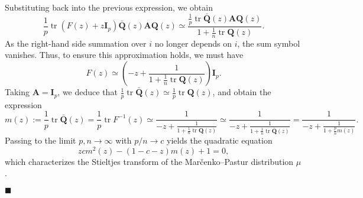 \documentclass[12pt]{article}
\DeclareMathOperator{\tr}{tr}
\begin{document}
Substituting back into the previous expression, we obtain
$$
\frac{1}{p} \tr (F(z) + z \mathbf{I}_p) \bar{\mathbf{Q}}(z) \mathbf{A} \mathbf{Q}(z) 
\simeq \frac{\frac{1}{p} \tr \bar{\mathbf{Q}}(z) \mathbf{A} \mathbf{Q}(z)}{1 + \frac{1}{n} \tr \mathbf{Q}(z)}.
$$
As the right-hand side summation over $i$ no longer depends on $i$, the sum symbol vanishes. Thus, to ensure this approximation holds, we must have
$$
F(z) \simeq \left( -z + \frac{1}{1 + \frac{1}{n} \tr \mathbf{Q}(z)} \right) \mathbf{I}_p.
$$
Taking $\mathbf{A} = \mathbf{I}_p$, we deduce that $\frac{1}{p} \tr \bar{\mathbf{Q}}(z) \simeq \frac{1}{p} \tr \mathbf{Q}(z)$, and obtain the expression
\begin{equation*}
m(z) := \frac{1}{p} \tr \bar{\mathbf{Q}}(z)
= \frac{1}{p} \tr F^{-1}(z)
\simeq \frac{1}{-z + \frac{1}{1 + \frac{1}{n} \tr \mathbf{Q}(z)}} \simeq \frac{1}{-z + \frac{1}{1 + \frac{1}{n} \tr \bar{\mathbf{Q}}(z)}}
= \frac{1}{-z + \frac{1}{1 + \frac{p}{n} m(z)}}.
\end{equation*}
Passing to the limit $p, n \to \infty$ with $p/n \to c$ yields the quadratic equation
$$
z c m^2(z) - (1 - c - z) m(z) + 1 = 0,
$$
which characterizes the Stieltjes transform of the Mar\v{c}enko--Pastur distribution $\mu$. 
\begin{flushright}
$\blacksquare$
\end{flushright}
\end{document}
